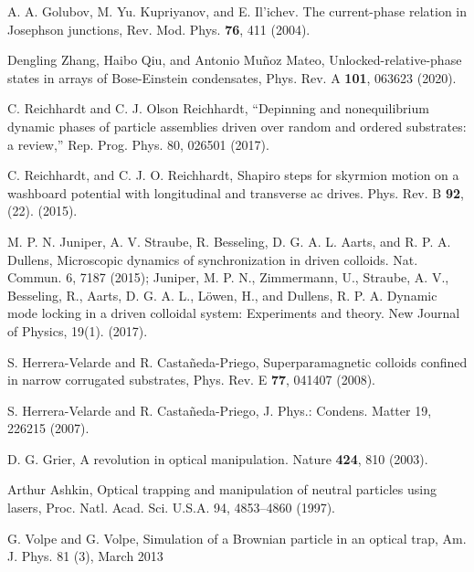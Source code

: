 \documentclass[twocolumn,preprintnumbers,amsmath,amssymb,aps,prx]{revtex4}
\begin{document}
\begin{thebibliography}{99}
     A. A. Golubov, M. Yu. Kupriyanov, and E. Il’ichev. The current-phase relation in Josephson junctions, Rev. Mod. Phys. {\bf 76}, 411 (2004).

      
     Dengling Zhang, Haibo Qiu, and Antonio Muñoz Mateo, Unlocked-relative-phase states in arrays of Bose-Einstein condensates, Phys. Rev. A {\bf 101}, 063623 (2020).

     C. Reichhardt and C. J. Olson Reichhardt, “Depinning and nonequilibrium dynamic phases of particle assemblies driven over random and ordered substrates: a review,” Rep. Prog. Phys. 80, 026501 (2017).

     C. Reichhardt, and C. J. O. Reichhardt,  Shapiro steps for skyrmion motion on a washboard potential with longitudinal and transverse ac drives. Phys. Rev. B {\bf 92}, (22). (2015).
      
     M. P. N. Juniper, A. V. Straube, R. Besseling, D. G. A. L. Aarts, and R. P. A. Dullens, Microscopic dynamics of synchronization in driven colloids. Nat. Commun. 6, 7187 (2015); 
      Juniper, M. P. N., Zimmermann, U., Straube, A. V., Besseling, R., Aarts, D. G. A. L., Löwen, H., and Dullens, R. P. A.  Dynamic mode locking in a driven colloidal system: Experiments and theory. New Journal of Physics, 19(1). (2017).  %
      
     S. Herrera-Velarde and R. Castañeda-Priego, Superparamagnetic colloids confined in narrow corrugated substrates, Phys. Rev. E {\bf 77}, 041407 (2008).

     S. Herrera-Velarde and R. Castañeda-Priego, J. Phys.: Condens. Matter 19, 226215 (2007).

     D. G. Grier, A revolution in optical manipulation. Nature {\bf 424}, 810 (2003).

      Arthur Ashkin, Optical trapping and manipulation of neutral particles using lasers, Proc. Natl. Acad. Sci. U.S.A. 94, 4853–4860 (1997).
        
       G. Volpe and G. Volpe, Simulation of a Brownian particle in an optical trap, Am. J. Phys. 81 (3), March 2013
        

\end{thebibliography}
\end{document}
